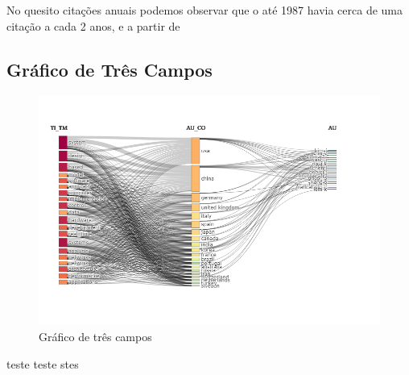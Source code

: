 No quesito citações anuais podemos observar que o até 1987 havia cerca de uma citação a cada 2 anos, e a partir de 

\subsection{Gráfico de Três Campos}



\begin{figure}[h]
    \centering
    \includegraphics[width=12cm]{experiments/GMalme/AnaliseBibliometrica/ImpactoDeJogosNaTecnologia/Figs/Three-Fields Plot.png}
    \caption{Gráfico de três campos}
    \label{fig:AIJ_graficoCampos}
\end{figure}

teste teste stes